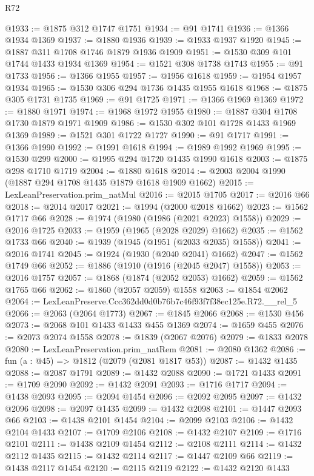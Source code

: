 \begin{lexlean}{R72}
\begin{coremodule}
@1933 := @1875 @312 @1747 @1751
@1934 := @91 @1741
@1936 := @1366 @1934 @1369
@1937 := @1880 @1936
@1939 := @1933 @1937 @1920
@1945 := @1887 @311 @1708 @1746 @1879 @1936 @1909
@1951 := @1530 @309 @101 @1744 @1433 @1934 @1369
@1954 := @1521 @308 @1738 @1743
@1955 := @91 @1733
@1956 := @1366 @1955
@1957 := @1956 @1618
@1959 := @1954 @1957 @1934
@1965 := @1530 @306 @294 @1736 @1435 @1955 @1618
@1968 := @1875 @305 @1731 @1735
@1969 := @91 @1725
@1971 := @1366 @1969 @1369
@1972 := @1880 @1971
@1974 := @1968 @1972 @1955
@1980 := @1887 @304 @1708 @1730 @1879 @1971 @1909
@1986 := @1530 @302 @101 @1728 @1433 @1969 @1369
@1989 := @1521 @301 @1722 @1727
@1990 := @91 @1717
@1991 := @1366 @1990
@1992 := @1991 @1618
@1994 := @1989 @1992 @1969
@1995 := @1530 @299
@2000 := @1995 @294 @1720 @1435 @1990 @1618
@2003 := @1875 @298 @1710 @1719
@2004 := @1880 @1618
@2014 := @2003 @2004 @1990 (@1887 @294 @1708 @1435 @1879 @1618 @1909 @1662)
@2015 := LexLeanPreservation.prim_natMul
@2016 := @2015 @1705
@2017 := @2016 @66
@2018 := @2014 @2017
@2021 := @1994 (@2000 @2018 @1662)
@2023 := @1562 @1717 @66
@2028 := @1974 (@1980 (@1986 (@2021 @2023) @1558))
@2029 := @2016 @1725
@2033 := @1959 (@1965 (@2028 @2029) @1662)
@2035 := @1562 @1733 @66
@2040 := @1939 (@1945 (@1951 (@2033 @2035) @1558))
@2041 := @2016 @1741
@2045 := @1924 (@1930 (@2040 @2041) @1662)
@2047 := @1562 @1749 @66
@2052 := @1886 (@1910 (@1916 (@2045 @2047) @1558))
@2053 := @2016 @1757
@2057 := @1868 (@1874 (@2052 @2053) @1662)
@2059 := @1562 @1765 @66
@2062 := @1860 (@2057 @2059) @1558
@2063 := @1854 @2062
@2064 := LexLeanPreserve.Ccc362dd0d0b76b7c46f93f7f38ec125e.R72.__rel_5
@2066 := @2063 (@2064 @1773)
@2067 := @1845 @2066
@2068 := @1530 @456
@2073 := @2068 @101 @1433 @1433 @455 @1369
@2074 := @1659 @455
@2076 := @2073 @2074 @1558
@2078 := @1839 (@2067 @2076)
@2079 := @1833 @2078
@2080 := LexLeanPreservation.prim_natRem
@2081 := @2080 @1362
@2086 := fun (a : @45) => @1812 (@2079 (@2081 @1817 @53))
@2087 := @1432 @1435
@2088 := @2087 @1791
@2089 := @1432 @2088
@2090 := @1721 @1433
@2091 := @1709 @2090
@2092 := @1432 @2091
@2093 := @1716 @1717
@2094 := @1438 @2093
@2095 := @2094 @1454
@2096 := @2092 @2095
@2097 := @1432 @2096
@2098 := @2097 @1435
@2099 := @1432 @2098
@2101 := @1447 @2093 @66
@2103 := @1438 @2101 @1454
@2104 := @2099 @2103
@2106 := @1432 @2104 @1433
@2107 := @1709 @2106
@2108 := @1432 @2107
@2109 := @1716 @2101
@2111 := @1438 @2109 @1454
@2112 := @2108 @2111
@2114 := @1432 @2112 @1435
@2115 := @1432 @2114
@2117 := @1447 @2109 @66
@2119 := @1438 @2117 @1454
@2120 := @2115 @2119
@2122 := @1432 @2120 @1433

\end{coremodule}
\end{lexlean}
